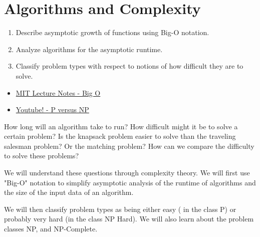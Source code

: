 

%
%

\chapter{Algorithms and Complexity}
\label{sec:complexity}
\begin{outcome}
\begin{enumerate}
\item Describe asymptotic growth of functions using Big-O notation.
\item Analyze algorithms for the asymptotic runtime.
\item Classify problem types with respect to notions of how difficult they are to solve.
\end{enumerate}
\end{outcome}


\begin{resource}
\begin{itemize}
\item \href{http://web.mit.edu/16.070/www/lecture/big_o.pdf}{MIT Lecture Notes - Big O}
\item \href{https://www.youtube.com/watch?v=YX40hbAHx3s}{Youtube! - P versus NP}
\end{itemize}
\end{resource}

How long will an algorithm take to run?   How difficult might it be to solve a certain problem?   Is the knapsack problem easier to solve than the traveling salesman problem?  Or the matching problem?  
How can we compare the difficulty to solve these problems?

 

We will understand these questions through complexity theory.   We will first use "Big-O" notation to simplify asymptotic analysis of the runtime of algorithms and the size of the input data of an algorithm.  

We will then classify problem types as being either easy ( in the class P) or probably very hard (in the class NP Hard).  We will also learn about the problem classes NP, and NP-Complete.  

